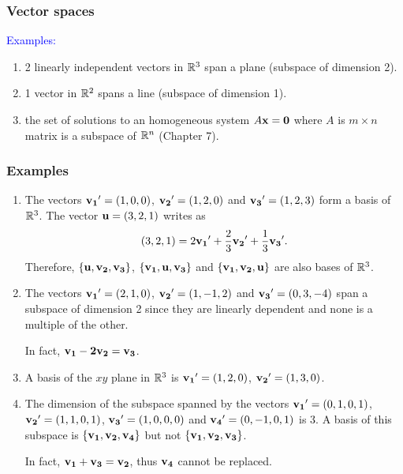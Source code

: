 \documentclass[11pt,aspectratio=169]{beamer}
\begin{document}
\begin{frame}
\frametitle{Vector spaces}
\begin{small}


\textcolor{blue}{Examples:} 
\begin{enumerate}
\item 2 linearly independent vectors in $\mathbb R^3$ span a plane (subspace of dimension 2).
\item 1 vector in $\mathbb R^2$ spans a line (subspace of dimension 1).
\item the set of solutions to an homogeneous system  $A\bf{x}=\bf{0}$  where $A$ is $m \times n$ matrix is a subspace of $\mathbb R^n$ (Chapter 7).
\end{enumerate}


\end{small}
\end{frame}


\begin{frame}
\frametitle{Examples}
\begin{small}
\begin{enumerate}
\item  The vectors ${\bf v_1}'=(1,0,0)$, ${\bf v_2}'=(1,2,0)$ and ${\bf v_3}'=(1,2,3)$ form a basis of $\mathbb R^3$.
The vector ${\bf u}=(3,2,1)$ writes as $$(3,2,1)=2{\bf v_1}'+\frac23{\bf v_2}'+\frac13 {\bf v_3}'.$$
Therefore, $\{\bf{u}, \bf{v}_2, \bf{v}_3\}$, $\{\bf{v}_1, \bf{u}, \bf{v}_3\}$ and $\{\bf{v}_1, \bf{v}_2, \bf{u}\}$ are also bases of $\mathbb R^3$.

\item The vectors ${\bf v_1}'=(2,1,0)$, ${\bf v_2}'=(1,-1,2)$ and ${\bf v_3}'=(0,3, -4)$ span a subspace of dimension 2 since they are linearly dependent and none is a multiple of the other. \begin{tiny}In fact, $\bf{v}_1-2\bf{v}_2=\bf{v}_3$. \end{tiny}

\item A basis of the $xy$ plane in $\mathbb R^3$ is ${\bf v_1}'=(1,2,0)$, ${\bf v_2}'=(1,3,0)$. 

\item The dimension of the subspace spanned by the vectors
${\bf v_1}'=(0,1,0,1)$, ${\bf v_2}'=(1,1,0,1)$, ${\bf v_3}'=(1,0,0,0)$
and ${\bf v_4}'=(0,-1,0,1)$ is 3. A basis of this subspace is $\{\bf{v}_1, \bf{v}_2, \bf{v}_4\}$ but not $\{\bf{v}_1, \bf{v}_2, \bf{v}_3\}$. \begin{tiny}In fact, $\bf{v}_1+\bf{v}_3=\bf{v}_2$, thus $\bf{v}_4$ cannot be replaced. \end{tiny}


\end{enumerate}

\end{small}
\end{frame}
\end{document}

